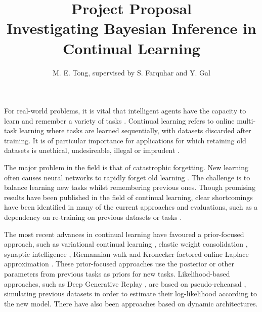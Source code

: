 \documentclass[a4paper,10pt]{article}
\title{\vspace*{-2.25em}\textbf{Project Proposal}\\ \vspace{0.25em} \Large Investigating Bayesian Inference in Continual Learning\vspace*{-0.75em}}
\author{M. E. Tong, supervised by S. Farquhar and Y. Gal}
\date{}
\begin{document}
\maketitle


\vspace{-1em}
For real-world problems, it is vital that intelligent agents have the capacity to learn and remember a variety of tasks \cite{ewc}. Continual learning refers to online multi-task learning where tasks are learned sequentially, with datasets discarded after training. It is of particular importance for applications for which retaining old datasets is unethical, undesireable, illegal or imprudent \cite{unifying, robust}. %

The major problem in the field is that of catastrophic forgetting. New learning often causes neural networks to rapidly forget old learning \cite{catastrophic}. The challenge is to balance learning new tasks whilst remembering previous ones. Though promising results have been published in the field of continual learning, clear shortcomings have been identified in many of the current approaches and evaluations, such as a dependency on re-training on previous datasets or tasks \cite{robust}. 

The most recent advances in continual learning have favoured a prior-focused approach, such as variational continual learning \cite{vcl}, elastic weight consolidation \cite{ewc}, synaptic intelligence \cite{si}, Riemannian walk \cite{rw} and Kronecker factored online Laplace approximation \cite{ritter}. These prior-focused approaches use the posterior or other parameters from previous tasks as priors for new tasks. Likelihood-based approaches, such as Deep Generative Replay \cite{dgr}, are based on pseudo-rehearsal \cite{robins}, simulating previous datasets in order to estimate their log-likelihood according to the new model. There have also been approaches based on dynamic architectures. %

\end{document}

